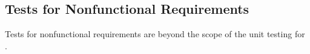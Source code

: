 \documentclass[12pt, titlepage]{article}
\begin{document}

\subsection{Tests for Nonfunctional Requirements}

Tests for nonfunctional requirements are beyond the scope of the unit testing for \progname{}.




		


					
					
					
					
					

					
					
					
					




\end{document}
